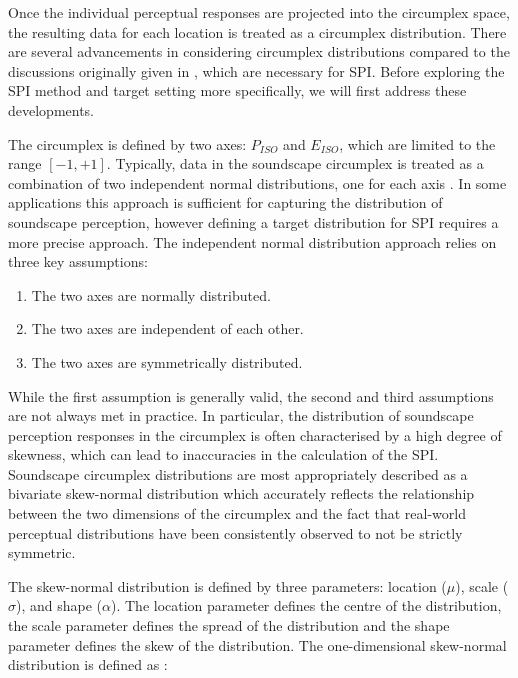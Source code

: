 \documentclass[
  authoryear,
  preprint,
  3p]{elsarticle}
\providecommand{\tightlist}{%
  \setlength{\itemsep}{0pt}\setlength{\parskip}{0pt}}\usepackage{longtable,booktabs,array}
\begin{document}
Once the individual perceptual responses are projected into the
circumplex space, the resulting data for each location is treated as a
circumplex distribution. There are several advancements in considering
circumplex distributions compared to the discussions originally given in
\citet{Mitchell2022How}, which are necessary for SPI. Before exploring
the SPI method and target setting more specifically, we will first
address these developments.

The circumplex is defined by two axes: \(P_{ISO}\) and \(E_{ISO}\),
which are limited to the range \([-1, +1]\). Typically, data in the
soundscape circumplex is treated as a combination of two independent
normal distributions, one for each axis
\citep{Mitchell2022How, Ooi2022Probably}. In some applications this
approach is sufficient for capturing the distribution of soundscape
perception, however defining a target distribution for SPI requires a
more precise approach. The independent normal distribution approach
relies on three key assumptions:

\begin{enumerate}
\def\labelenumi{\arabic{enumi}.}
\tightlist
\item
  The two axes are normally distributed.
\item
  The two axes are independent of each other.
\item
  The two axes are symmetrically distributed.
\end{enumerate}

While the first assumption is generally valid, the second and third
assumptions are not always met in practice. In particular, the
distribution of soundscape perception responses in the circumplex is
often characterised by a high degree of skewness, which can lead to
inaccuracies in the calculation of the SPI. Soundscape circumplex
distributions are most appropriately described as a bivariate
skew-normal distribution \citep{Azzalini2005Skew} which accurately
reflects the relationship between the two dimensions of the circumplex
and the fact that real-world perceptual distributions have been
consistently observed to not be strictly symmetric.

The skew-normal distribution is defined by three parameters: location
(\(\mu\)), scale (\(\sigma\)), and shape (\(\alpha\)). The location
parameter defines the centre of the distribution, the scale parameter
defines the spread of the distribution and the shape parameter defines
the skew of the distribution. The one-dimensional skew-normal
distribution is defined as \citep{Azzalini1996Multivariate}:
\end{document}
